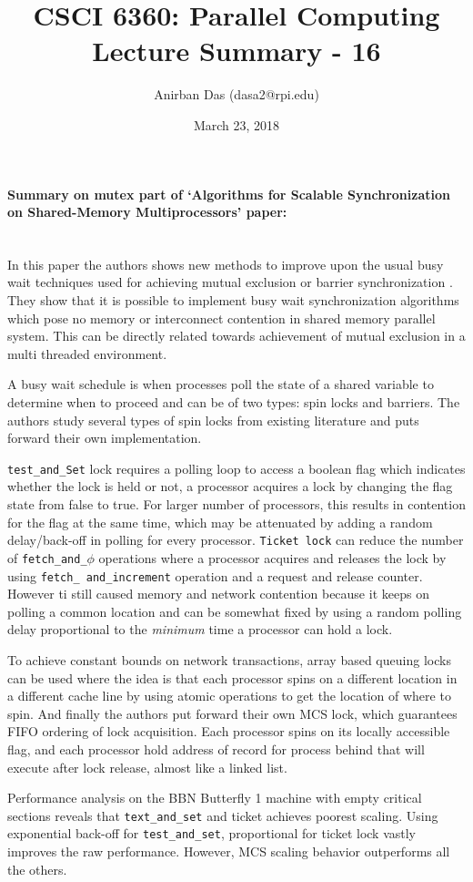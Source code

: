 \documentclass[a4paper,12 pt]{article}
\title{\vspace{-2.0cm}CSCI 6360: Parallel Computing Lecture Summary - 16}
\author{Anirban Das (dasa2@rpi.edu) }
\date{March 23, 2018}
\begin{document}
\maketitle

\paragraph{Summary on mutex part of `Algorithms for Scalable Synchronization on Shared-Memory Multiprocessors' paper:\\\\}

In this paper the authors shows new methods to improve upon the usual busy wait techniques used for achieving mutual exclusion or barrier synchronization . They show that it is possible to implement busy wait synchronization algorithms which pose no memory or interconnect contention in shared memory parallel system. This can be directly related towards achievement of mutual exclusion in a multi threaded environment. 

A busy wait schedule is when processes poll the state of a shared variable to determine when to proceed and can be of two types: spin locks and barriers. The authors study several types of spin locks from existing literature and puts forward their own implementation.

\texttt{test\_and\_Set} lock requires a polling loop to access a boolean flag which indicates whether the lock is held or not, a processor acquires a lock by changing the flag state from false to true. For larger number of processors, this results in contention for the flag at the same time, which may be attenuated by adding a random delay/back-off in polling for every processor. \texttt{Ticket lock} can reduce the number of \texttt{fetch\_and\_$\phi$} operations  where a processor acquires and releases the lock by using \texttt{fetch\_ and\_increment} operation and a request and release counter. However ti still caused memory and network contention because it keeps on polling a common location and can be somewhat fixed by using a random polling delay proportional to the \textit{minimum} time a processor can hold a lock.

To achieve constant bounds on network transactions, array based queuing locks can be used where the idea is that each processor spins on a different location in a different cache line by using atomic operations to get the location of where to spin. And finally the authors put forward their own MCS lock, which guarantees FIFO ordering of lock acquisition. Each processor spins on its locally accessible flag, and each processor hold address of record for process behind that will execute after lock release, almost like a linked list.  

Performance analysis on the BBN Butterfly 1 machine with empty critical sections reveals that \texttt{text\_and\_set} and ticket achieves poorest scaling. Using exponential back-off for \texttt{test\_and\_set}, proportional for ticket lock vastly improves the raw performance. However, MCS scaling behavior outperforms all the others. 
\end{document}
